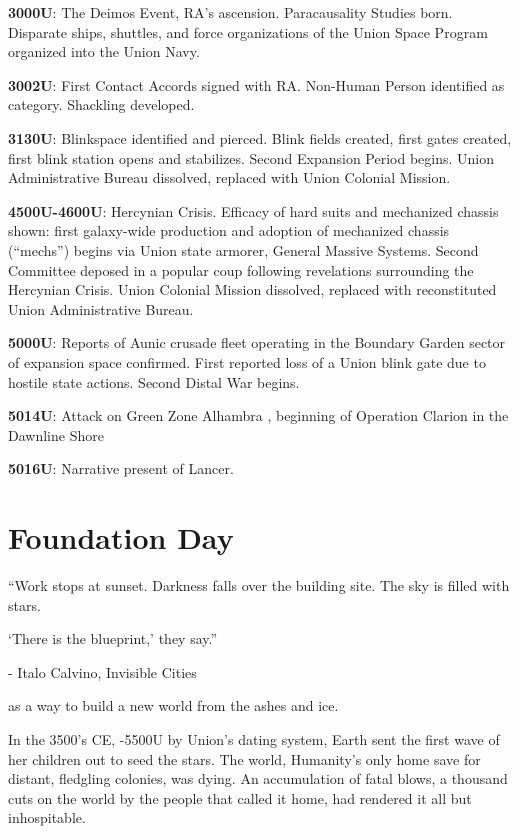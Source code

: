 \textbf{3000U}: The Deimos Event, RA’s ascension. Paracausality Studies born. Disparate ships, shuttles,
and force organizations of the Union Space Program organized into the Union Navy.

\textbf{3002U}: First Contact Accords signed with RA. Non-Human Person identified as category.
Shackling developed.

\textbf{3130U}: Blinkspace identified and pierced. Blink fields created, first gates created, first blink
station opens and stabilizes. Second Expansion Period begins. Union Administrative Bureau
dissolved, replaced with Union Colonial Mission.

\textbf{4500U-4600U}: Hercynian Crisis. Efficacy of hard suits and mechanized chassis shown: first
galaxy-wide production and adoption of mechanized chassis (“mechs”) begins via Union state
armorer, General Massive Systems. Second Committee deposed in a popular coup following
revelations surrounding the Hercynian Crisis. Union Colonial Mission dissolved, replaced with
reconstituted Union Administrative Bureau.

\textbf{5000U}: Reports of Aunic crusade fleet operating in the Boundary Garden sector of expansion
space confirmed. First reported loss of a Union blink gate due to hostile state actions. Second
Distal War begins.

\textbf{5014U}: Attack on Green Zone Alhambra , beginning of Operation Clarion in the Dawnline Shore

\textbf{5016U}: Narrative present of Lancer.

\section{Foundation Day}

\begin{epiQuote}
    “Work stops at sunset. Darkness falls over the building site. The sky is filled with stars.
    
    ‘There is the blueprint,’ they say.”

    \quad - Italo Calvino, \textnormal{Invisible Cities}
\end{epiQuote}

 as a way to build a new world from the ashes and ice.

In the 3500’s CE, -5500U by Union’s dating system, Earth sent the first wave of her children out
to seed the stars. The world, Humanity’s only home save for distant, fledgling colonies, was
dying. An accumulation of fatal blows, a thousand cuts on the world by the people that called it
home, had rendered it all but inhospitable.

